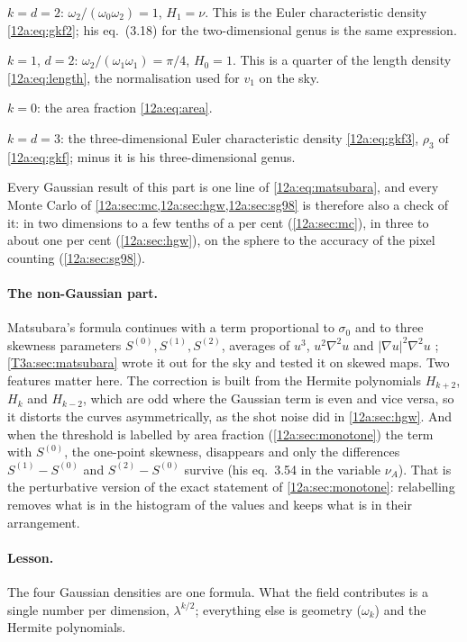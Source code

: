 \begin{explain}
  \item $k=d=2$: $\omega_2/(\omega_0\omega_2)=1$, $H_1=\nu$. This is the Euler characteristic density
        \eqref{12a:eq:gkf2}; his eq.~(3.18) for the two-dimensional genus is the same expression.
  \item $k=1$, $d=2$: $\omega_2/(\omega_1\omega_1)=\pi/4$, $H_0=1$. This is a quarter of the length density
        \eqref{12a:eq:length}, the normalisation used for $v_1$ on the sky.
  \item $k=0$: the area fraction \eqref{12a:eq:area}.
  \item $k=d=3$: the three-dimensional Euler characteristic density \eqref{12a:eq:gkf3}, $\rho_3$ of
        \eqref{12a:eq:gkf}; minus it is his three-dimensional genus.
\end{explain}
Every Gaussian result of this part is one line of \eqref{12a:eq:matsubara}, and every Monte Carlo of
\cref{12a:sec:mc,12a:sec:hgw,12a:sec:sg98} is therefore also a check of it: in two dimensions to a few tenths of a
per cent (\cref{12a:sec:mc}), in three to about one per cent (\cref{12a:sec:hgw}), on the sphere to the accuracy
of the pixel counting (\cref{12a:sec:sg98}).

\paragraph{The non-Gaussian part.} Matsubara's formula continues with a term proportional to $\sigma_0$ and to
three skewness parameters $S^{(0)},S^{(1)},S^{(2)}$, averages of $u^3$, $u^2\nabla^2u$ and
$|\nabla u|^2\nabla^2u$ \cite{Matsubara2003}; \cref{T3a:sec:matsubara} wrote it out for the sky and tested it on
skewed maps. Two features matter here. The correction is built from the Hermite polynomials $H_{k+2}$, $H_k$
and $H_{k-2}$, which are odd where the Gaussian term is even and vice versa, so it distorts the curves
asymmetrically, as the shot noise did in \cref{12a:sec:hgw}. And when the threshold is labelled by area fraction
(\cref{12a:sec:monotone}) the term with $S^{(0)}$, the one-point skewness, disappears and only the differences
$S^{(1)}-S^{(0)}$ and $S^{(2)}-S^{(0)}$ survive (his eq.~3.54 in the variable $\nu_A$). That is the perturbative
version of the exact statement of \cref{12a:sec:monotone}: relabelling removes what is in the histogram of the
values and keeps what is in their arrangement.

\paragraph{Lesson.} The four Gaussian densities are one formula. What the field contributes is a single number
per dimension, $\lambda^{k/2}$; everything else is geometry ($\omega_k$) and the Hermite polynomials.

